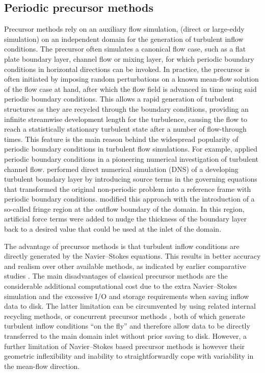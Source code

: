 	\subsection{Periodic precursor methods}
	Precursor methods rely on an auxiliary flow simulation, (direct or large-eddy simulation) on an independent domain for the generation of turbulent inflow conditions.
	The precursor often simulates a canonical flow case, such as a flat plate boundary layer, channel flow or mixing layer, for which periodic
	boundary conditions in horizontal directions can be invoked. In practice, the precursor is often initiated by imposing random perturbations on a known mean-flow solution of the flow case at hand, after which the flow field is advanced in time using said periodic boundary conditions. This allows a rapid generation of turbulent structures as they are recycled through the boundary conditions, providing an infinite streamwise development length for the turbulence, causing the flow to reach a statistically stationary turbulent state after a number of flow-through times. This feature is the main reason behind the widespread popularity of periodic boundary conditions in turbulent flow simulations. For example, \cite{kimmoin} applied
	periodic boundary conditions in a pioneering numerical investigation of turbulent channel flow. \cite{spalart1988direct} performed direct numerical simulation (DNS) of a developing turbulent boundary layer by introducing source terms in the governing equations that transformed the original non-periodic problem into a reference frame with periodic boundary conditions.  \cite{spalart1993experimental} modified this approach with the introduction of a so-called fringe region at the outflow boundary of the domain. In this region, artificial force terms were added to nudge the thickness of the boundary layer back to a desired value that could be used at the inlet of the domain.
	
	The advantage of precursor methods is that turbulent inflow conditions are directly generated by the Navier--Stokes equations. This results in
	better accuracy and realism over other available methods, as indicated by earlier comparative studies  \citep{keating2004priori,
	tabor2010inlet}. The main disadvantages of classical precursor methods are the considerable additional computational cost due to the extra
	Navier--Stokes simulation and the excessive I/O and storage requirements when saving inflow data to disk. The latter limitation can be
	circumvented by using related internal recycling methods, \cite[see,
	e.g.,][]{lund1998generation,mayor2002application,ferrante2004robust,araya2009inlet,araya2011dynamic} or concurrent precursor methods
	\citep{stevens2014large,stevens2014concurrent}, both of which generate turbulent inflow conditions ``on the fly'' and therefore allow data to
	be directly transferred to the main domain inlet without prior saving to disk. However, a further limitation of Navier--Stokes based precursor methods is however their geometric inflexibility and inability to straightforwardly cope with variability in the mean-flow direction. 
	
